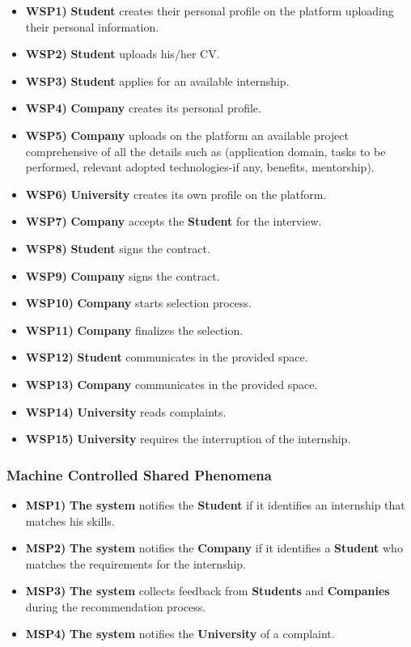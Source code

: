 \begin{itemize}
    \item \textbf{WSP1)} \textbf{Student} creates their personal profile on the platform uploading their personal information.
    \item \textbf{WSP2)} \textbf{Student} uploads his/her CV.
    \item \textbf{WSP3)} \textbf{Student} applies for an available internship.
    \item \textbf{WSP4)} \textbf{Company} creates its personal profile.
    \item \textbf{WSP5)} \textbf{Company} uploads on the platform an available project comprehensive of all the details such as (application domain, tasks to be performed, relevant adopted technologies-if any, benefits, mentorship).
    \item \textbf{WSP6)} \textbf{University} creates its own profile on the platform.
    \item \textbf{WSP7)} \textbf{Company} accepts the \textbf{Student} for the interview.
    \item \textbf{WSP8)} \textbf{Student} signs the contract.
    \item \textbf{WSP9)} \textbf{Company} signs the contract.
    \item \textbf{WSP10)} \textbf{Company} starts selection process.
    \item \textbf{WSP11)} \textbf{Company} finalizes the selection.
    \item \textbf{WSP12)} \textbf{Student} communicates in the provided space.
    \item \textbf{WSP13)} \textbf{Company} communicates in the provided space.
    \item \textbf{WSP14)} \textbf{University} reads complaints.
    \item \textbf{WSP15)} \textbf{University} requires the interruption of the internship.
\end{itemize}

\subsubsection{Machine Controlled Shared Phenomena}

\begin{itemize}
    \item \textbf{MSP1)} \textbf{The system} notifies the \textbf{Student} if it identifies an internship that matches his skills.
    \item \textbf{MSP2)} \textbf{The system} notifies the \textbf{Company} if it identifies a \textbf{Student} who matches the requirements for the internship.
    \item \textbf{MSP3)} \textbf{The system} collects feedback from \textbf{Students} and \textbf{Companies} during the recommendation process.
    \item \textbf{MSP4)} \textbf{The system} notifies the \textbf{University} of a complaint.
\end{itemize}

